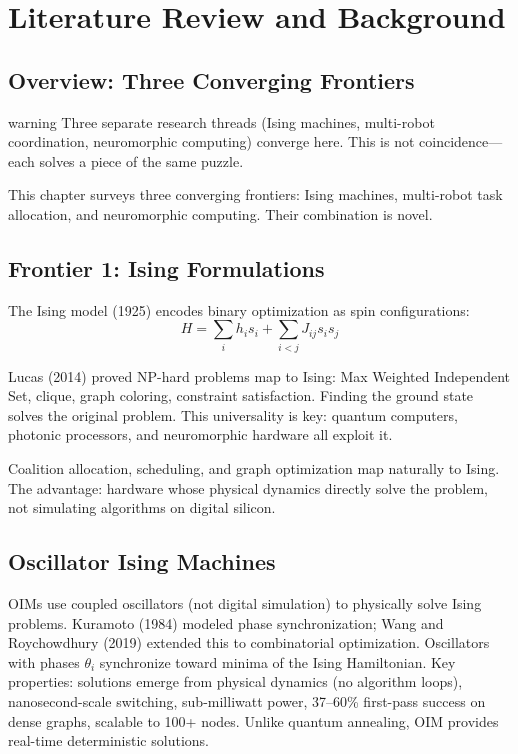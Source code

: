 \chapter{Literature Review and Background}
\label{ch:background}

\section{Overview: Three Converging Frontiers}
\begin{block}{warning}
Three separate research threads (Ising machines, multi-robot coordination, neuromorphic computing) converge here. This is not coincidence—each solves a piece of the same puzzle.
\end{block}


This chapter surveys three converging frontiers: Ising machines, multi-robot task allocation, and neuromorphic computing. Their combination is novel.

\section{Frontier 1: Ising Formulations}

The Ising model (1925) encodes binary optimization as spin configurations:
\[
H = \sum_i h_i s_i + \sum_{i<j} J_{ij} s_i s_j
\]

Lucas (2014) proved NP-hard problems map to Ising: Max Weighted Independent Set, clique, graph coloring, constraint satisfaction. Finding the ground state solves the original problem. This universality is key: quantum computers, photonic processors, and neuromorphic hardware all exploit it.

Coalition allocation, scheduling, and graph optimization map naturally to Ising. The advantage: hardware whose physical dynamics directly solve the problem, not simulating algorithms on digital silicon.

\section{Oscillator Ising Machines}

OIMs use coupled oscillators (not digital simulation) to physically solve Ising problems. Kuramoto (1984) modeled phase synchronization; Wang and Roychowdhury (2019) extended this to combinatorial optimization. Oscillators with phases $\theta_i$ synchronize toward minima of the Ising Hamiltonian. Key properties: solutions emerge from physical dynamics (no algorithm loops), nanosecond-scale switching, sub-milliwatt power, 37--60\% first-pass success on dense graphs, scalable to 100+ nodes. Unlike quantum annealing, OIM provides real-time deterministic solutions.

